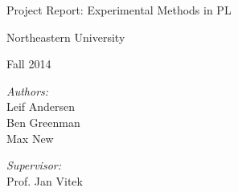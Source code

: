 \begin{titlepage}
  \begin{center}
    {\Huge Project Report: Experimental Methods in PL }

    \vspace{1cm}

    {\Large Northeastern University}

    {\Large Fall 2014}

    \vspace{2cm}

    \begin{minipage}{0.4\textwidth}
      \begin{flushleft} \large
        \emph{Authors:}
        \\ Leif Andersen
        \\ Ben Greenman
        \\ Max New
      \end{flushleft}
    \end{minipage}
    \begin{minipage}{0.4\textwidth}
      \begin{flushright} \large
        \emph{Supervisor:}
        \\ Prof. Jan Vitek
      \end{flushright}
    \end{minipage}
  \end{center}
\end{titlepage}
